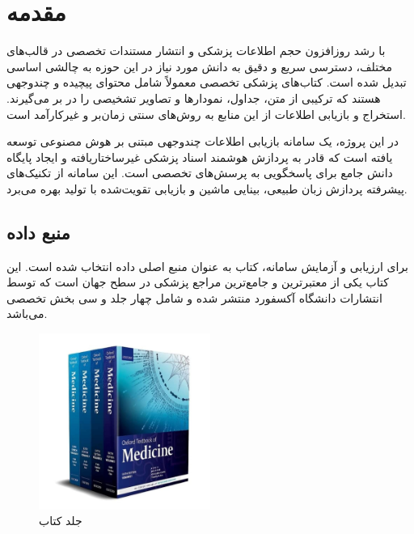 % 

\section{مقدمه}
با رشد روزافزون حجم اطلاعات پزشکی و انتشار مستندات تخصصی در قالب‌های مختلف، دسترسی سریع و دقیق به دانش مورد نیاز در این حوزه به چالشی اساسی تبدیل شده است. کتاب‌های پزشکی تخصصی معمولاً شامل محتوای پیچیده و چندوجهی هستند که ترکیبی از متن، جداول، نمودارها و تصاویر تشخیصی را در بر می‌گیرند. استخراج و بازیابی اطلاعات از این منابع به روش‌های سنتی زمان‌بر و غیرکارآمد است.

در این پروژه، یک سامانه بازیابی اطلاعات چندوجهی مبتنی بر هوش مصنوعی توسعه یافته است که قادر به پردازش هوشمند اسناد پزشکی غیرساختاریافته و ایجاد پایگاه دانش جامع برای پاسخگویی به پرسش‌های تخصصی است. این سامانه از تکنیک‌های پیشرفته پردازش زبان طبیعی، بینایی ماشین و بازیابی تقویت‌شده با تولید  بهره می‌برد.

\subsection{منبع داده}
برای ارزیابی و آزمایش سامانه، کتاب  به عنوان منبع اصلی داده انتخاب شده است. این کتاب یکی از معتبرترین و جامع‌ترین مراجع پزشکی در سطح جهان است که توسط انتشارات دانشگاه آکسفورد منتشر شده و شامل چهار جلد و سی بخش تخصصی می‌باشد.

\begin{figure}[h]
    \centering
    \includegraphics[width=0.5\textwidth]{oxford_cover.jpg}
    \caption{جلد کتاب }
    \label{fig:oxford_cover}
\end{figure}


